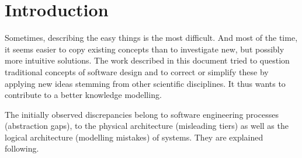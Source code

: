 %
%
%
%
%
%
%

\section{Introduction}
\label{introduction_heading}

Sometimes, describing the easy things is the most difficult. And most of the
time, it seems easier to copy existing concepts than to investigate new, but
possibly more intuitive solutions. The work described in this document tried to
question traditional concepts of software design and to correct or simplify
these by applying new ideas stemming from other scientific disciplines. It thus
wants to contribute to a better knowledge modelling.

The initially observed discrepancies belong to software engineering processes
(abstraction gaps), to the physical architecture (misleading tiers) as well as
the logical architecture (modelling mistakes) of systems. They are explained
following.




